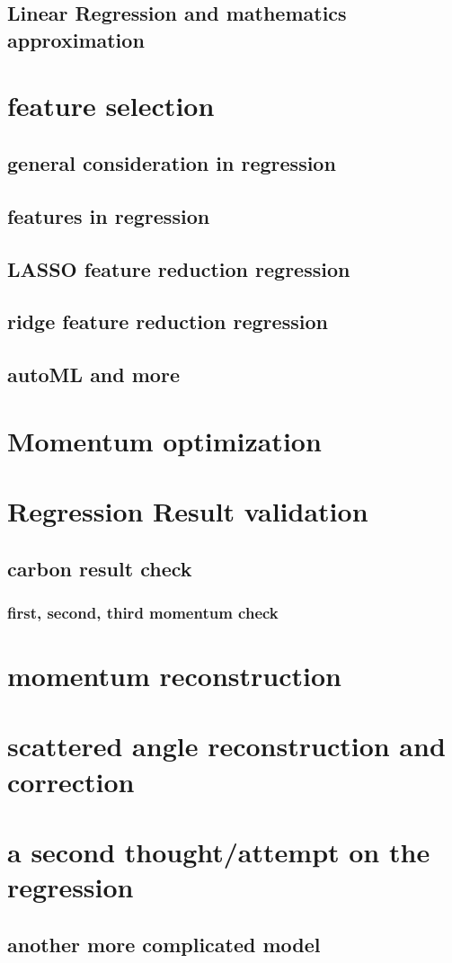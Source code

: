 \subsection{Linear Regression and mathematics approximation}




\section{feature selection}

\subsection{general consideration in regression}

\subsection{features in regression}

\subsection{LASSO feature reduction regression}

\subsection{ridge feature reduction regression}

\subsection{autoML and more}

\section{Momentum optimization}

\section{Regression Result validation}

\subsection{carbon result check}

\subsubsection{first, second, third momentum check}

\section{momentum reconstruction}

\section{scattered angle reconstruction and correction}

\section{a second thought/attempt on the regression}

\subsection{another more complicated model}